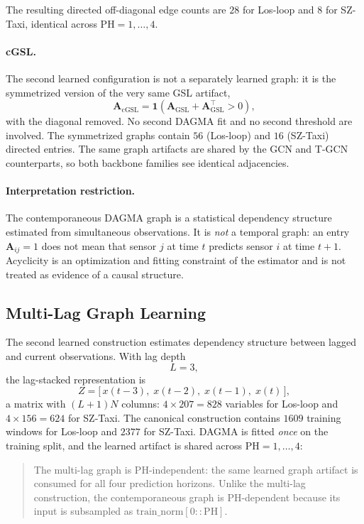 The resulting directed off-diagonal edge counts are $28$ for Los-loop and $8$
for SZ-Taxi, identical across $\mathrm{PH}=1,\dots,4$.

\paragraph{cGSL.}
The second learned configuration is not a separately learned graph: it is the
symmetrized version of the very same GSL artifact,
\[
\mathbf{A}_{\mathrm{cGSL}}
=\mathbf{1}\!\left(\mathbf{A}_{\mathrm{GSL}}+\mathbf{A}_{\mathrm{GSL}}^{\top}>0\right),
\]
with the diagonal removed. No second DAGMA fit and no second threshold are
involved. The symmetrized graphs contain $56$ (Los-loop) and $16$ (SZ-Taxi)
directed entries. The same graph artifacts are shared by the GCN and T-GCN
counterparts, so both backbone families see identical adjacencies.

\paragraph{Interpretation restriction.}
The contemporaneous DAGMA graph is a statistical dependency structure
estimated from simultaneous observations. It is \emph{not} a temporal graph:
an entry $\mathbf{A}_{ij}=1$ does not mean that sensor $j$ at time $t$ predicts
sensor $i$ at time $t+1$. Acyclicity is an optimization and fitting constraint
of the estimator and is not treated as evidence of a causal structure.

\subsection{Multi-Lag Graph Learning}\label{sec:gsl_multilag}

The second learned construction estimates dependency structure between lagged
and current observations. With lag depth
\[
L=3,
\]
the lag-stacked representation is
\[
Z=\bigl[\,x(t-3),\;x(t-2),\;x(t-1),\;x(t)\,\bigr],
\]
a matrix with $(L+1)N$ columns: $4\times 207=828$ variables for Los-loop and
$4\times 156=624$ for SZ-Taxi. The canonical construction contains $1609$
training windows for Los-loop and $2377$ for SZ-Taxi. DAGMA is fitted
\emph{once} on the training split, and the learned artifact is shared across
$\mathrm{PH}=1,\dots,4$:
\begin{quote}
The multi-lag graph is PH-independent: the same learned graph artifact is
consumed for all four prediction horizons. Unlike the multi-lag construction,
the contemporaneous graph is PH-dependent because its input is subsampled as
$\mathrm{train\_norm}[0::\mathrm{PH}]$.
\end{quote}

